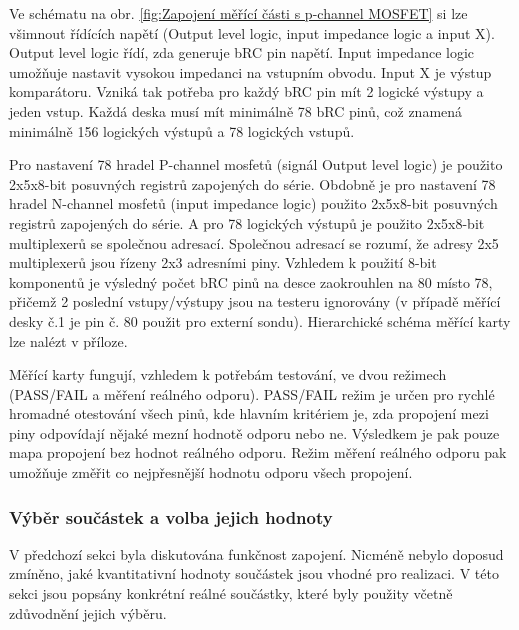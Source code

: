 Ve schématu na obr. \ref{fig:Zapojení měřící části s p-channel MOSFET}
si lze všimnout řídících napětí (Output level logic, input impedance logic a input X).
Output level logic řídí, zda generuje bRC pin napětí.
Input impedance logic umožňuje nastavit vysokou impedanci na vstupním obvodu. Input X je výstup komparátoru. Vzniká
tak potřeba pro každý bRC pin mít 2 logické výstupy a jeden vstup. Každá deska musí mít minimálně 78 bRC pinů,
což znamená minimálně 156 logických výstupů a 78 logických vstupů.\par

Pro nastavení 78 hradel P-channel mosfetů (signál Output level logic) je použito 2x5x8-bit posuvných registrů zapojených do série.
Obdobně je pro nastavení 78 hradel N-channel mosfetů (input impedance logic) použito 2x5x8-bit posuvných registrů zapojených do série.
A pro 78 logických výstupů je použito 2x5x8-bit multiplexerů se společnou adresací.
Společnou adresací se rozumí, že adresy 2x5 multiplexerů jsou řízeny 2x3 adresními piny.
Vzhledem k použití 8-bit komponentů je výsledný počet bRC pinů na desce zaokrouhlen na 80 místo 78,
přičemž 2 poslední vstupy/výstupy jsou na testeru ignorovány
(v případě měřící desky č.1 je pin č. 80 použit pro externí sondu). 
Hierarchické schéma měřící karty lze nalézt v příloze.\par

Měřící karty fungují, vzhledem k potřebám testování, ve dvou režimech (PASS/FAIL a měření reálného odporu).
PASS/FAIL režim je určen pro rychlé hromadné otestování všech pinů,
kde hlavním kritériem je, zda propojení mezi piny odpovídají nějaké mezní hodnotě odporu nebo ne.
Výsledkem je pak pouze mapa propojení bez hodnot reálného odporu.
Režim měření reálného odporu pak umožňuje změřit co nejpřesnější hodnotu odporu všech propojení.
\clearpage
\subsubsection{Výběr součástek a volba jejich hodnoty}
V předchozí sekci byla diskutována funkčnost zapojení.
Nicméně nebylo doposud zmíněno, jaké kvantitativní hodnoty součástek jsou vhodné pro realizaci.
V této sekci jsou popsány konkrétní reálné součástky, které byly použity včetně zdůvodnění jejich výběru.\par

